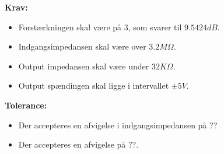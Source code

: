 \noindent\textbf{Krav:}
\begin{itemize}
	\item Forstærkningen skal være på 3, som svarer til $9.5424dB$.
	\item Indgangsimpedansen skal være over $3.2M\Omega$.
	\item Output impedansen skal være under $32K\Omega$.
	\item Output spændingen skal ligge i intervallet $\pm5V$.
\end{itemize}
\noindent\textbf{Tolerance:}
\begin{itemize}
	\item Der accepteres en afvigelse i indgangsimpedansen på ??
	\item Der accepteres en afvigelse på ??.
\end{itemize}
